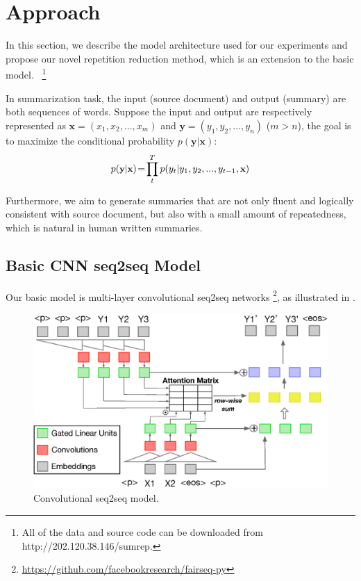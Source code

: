 \section{Approach}
\label{sec:approach}

In this section, we describe the model architecture used for our experiments
and propose our novel repetition reduction method, which is an extension to the basic model.
~\footnote{
All of the data and source code
can be downloaded from http://202.120.38.146/sumrep.}

In summarization task, the input (source document) and
output (summary) are both sequences of words.
Suppose the input and output are respectively represented as
$\textbf{x} = (x_{1},x_{2},...,x_{m})$ and 
$\textbf{y} = (y_{1}, y_{2},..., y_{n})$ ($m>n$),
the goal is to maximize the conditional probability
$p(\textbf{y}|\textbf{x})$:
\begin{equation}
\small
p(\textbf{y} | \textbf{x}) \!=\! {\prod^T_{t} {p(y_{t} | y_{1}, y_{2},..., y_{t-1}, \textbf{x}})}
\end{equation}

Furthermore, we aim to generate summaries that are not only fluent 
and logically consistent with source document, but also with 
a small amount of repeatedness, which is natural in human written summaries.  

\subsection{Basic CNN seq2seq Model}
\label{sec:basic}
Our basic model is multi-layer convolutional seq2seq networks \cite{gehring2017convs2s}
\footnote{\url{https://github.com/facebookresearch/fairseq-py}}, 
as illustrated in . 

\begin{figure}[th]
    \centering
    \includegraphics[width=0.8\linewidth]{cnn}
    \caption{Convolutional seq2seq model.}
    \label{fig:basicModel}
\end{figure}

